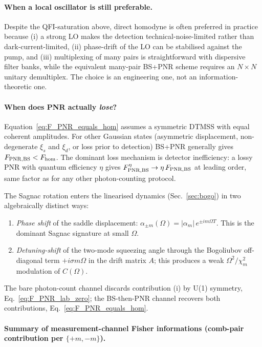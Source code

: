 \documentclass[11pt]{article}
\begin{document}
\paragraph{When a local oscillator is still preferable.}  Despite the
QFI-saturation above, direct homodyne is often preferred in practice
because (i) a strong LO makes the detection technical-noise-limited
rather than dark-current-limited, (ii) phase-drift of the LO can be
stabilised against the pump, and (iii) multiplexing of many pairs
is straightforward with dispersive filter banks, while the
equivalent many-pair BS+PNR scheme requires an $N\times N$ unitary
demultiplex.  The choice is an engineering one, not an
information-theoretic one.

\paragraph{When does PNR actually \emph{lose}?}
Equation~\eqref{eq:F_PNR_equals_hom} assumes a symmetric DTMSS with
equal coherent amplitudes.  For other Gaussian states (asymmetric
displacement, non-degenerate $\xi_s$ and $\xi_d$, or loss prior to
detection) BS+PNR generally gives $F_{\rm PNR,BS}<F_{\rm hom}$.  The
dominant loss mechanism is detector inefficiency: a lossy PNR
with quantum efficiency $\eta$ gives
$F_{\rm PNR,BS}^\eta \to \eta\,F_{\rm PNR,BS}$ at leading order,
same factor as for any other photon-counting protocol.

The Sagnac rotation enters the linearised dynamics
(Sec.~\ref{sec:bogo}) in two algebraically distinct ways:

\begin{enumerate}
\item[(i)] \emph{Phase shift} of the saddle displacement:
  $\alpha_{\pm m}(\Omega) = |\alpha_m|\,e^{\pm i m\Omega T}$.  This is
  the dominant Sagnac signature at small $\Omega$.
\item[(ii)] \emph{Detuning-shift} of the two-mode squeezing angle
  through the Bogoliubov off-diagonal term $+i\sigma m\Omega$
  in the drift matrix $A$; this produces a weak $\Omega^2/\chi_m^2$
  modulation of $C(\Omega)$.
\end{enumerate}

The bare photon-count channel discards contribution (i) by U(1)
symmetry, Eq.~\eqref{eq:F_PNR_lab_zero}; the BS-then-PNR channel
recovers both contributions, Eq.~\eqref{eq:F_PNR_equals_hom}.

\paragraph{Summary of measurement-channel Fisher informations
(comb-pair contribution per $\{+m,-m\}$).}
\end{document}
